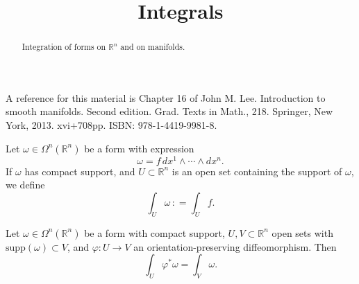 \documentclass{ximera}
\title{Integrals}
\begin{document}
    \begin{abstract} Integration of forms on $\mathbb{R}^n$ and on manifolds.   \end{abstract}
    \maketitle

    A reference for this material is Chapter 16 of John M. Lee. Introduction to smooth manifolds. Second edition. Grad. Texts in Math., 218. Springer, New York, 2013. xvi+708pp. ISBN: 978-1-4419-9981-8.
    

\begin{definition}
    Let $\omega \in \Omega ^n (\mathbb{R}^n)$ be a form with expression 
    \[  \omega = f \, dx^1 \wedge \cdots \wedge dx^n   .          \] 
    If $\omega $ has compact support, and $U \subset \mathbb{R}^n$ is an open set containing the support of $\omega$, we define
    \[      \int_{U}  \omega \,  : =  \int_{U} f  .    \]
\end{definition}

\begin{theorem}
Let $\omega \in \Omega ^n (\mathbb{R}^n)$ be a form with compact support,  $U , V \subset \mathbb{R}^n$ open sets with $\text{supp}(\omega ) \subset V $, and $\varphi : U \to V$ an orientation-preserving diffeomorphism. Then 
\[      \int_{U} \varphi ^{\ast} \omega = \int_{V} \omega .                   \]
\end{theorem}
\end{document}
